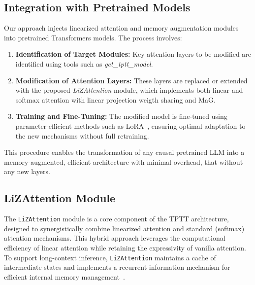 \documentclass[10pt,a4paper]{article}
\begin{document}
\subsection{Integration with Pretrained Models}

Our approach injects linearized attention and memory augmentation modules into pretrained Transformers models. The process involves:
\begin{enumerate}
    \item \textbf{Identification of Target Modules:} Key attention layers to be modified are identified using tools such as \textit{get\_tptt\_model}.
    \item \textbf{Modification of Attention Layers:} These layers are replaced or extended with the proposed \textit{LiZAttention} module, which implements both linear and softmax attention with linear projection weigth sharing and MaG.
    \item \textbf{Training and Fine-Tuning:} The modified model is fine-tuned using parameter-efficient methods such as LoRA~\cite{hu2022lora}, ensuring optimal adaptation to the new mechanisms without full retraining.
\end{enumerate}
This procedure enables the transformation of any causal pretrained LLM into a memory-augmented, efficient architecture with minimal overhead, that without any new layers.


\subsection{LiZAttention Module}

The \texttt{LiZAttention} module is a core component of the TPTT architecture, designed to synergistically combine linearized attention and standard (softmax) attention mechanisms. This hybrid approach leverages the computational efficiency of linear attention while retaining the expressivity of vanilla attention. To support long-context inference, \texttt{LiZAttention} maintains a cache of intermediate states and implements a recurrent information mechanism for efficient internal memory management~\cite{katharopoulos2020transformers}.
\end{document}

